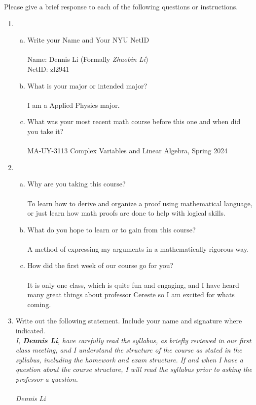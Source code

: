 \documentclass[12pt]{article}
\begin{document}
Please give a brief response to each of the following questions or instructions.
\begin{enumerate}
\item
    \begin{enumerate}[(a)]
        \item Write your Name and Your NYU NetID \\
        \\Name: Dennis Li (Formally \textit{Zhuobin Li})\\
        NetID: zl2941\\
        \item What is your major or intended major?\\
        \\I am a Applied Physics major.\\
        \item What was your most recent math course before this one and when did you take it?\\
        \\MA-UY-3113 Complex Variables and Linear Algebra, Spring 2024\\
    \end{enumerate}
\item
    \begin{enumerate}[(a)]
        \item Why are you taking this course? \\
        \\To learn how to derive and organize a proof using mathematical language, or just learn how math proofs are done to help with logical skills. \\
        \item What do you hope to learn or to gain from this course? \\
        \\A method of expressing my arguments in a mathematically rigorous way. \\
        \item How did the first week of our course go for you?\\
        \\It is only one class, which is quite fun and engaging, and I have heard many great things about professor Cereste so I am excited for whats coming.  \\
    \end{enumerate}

\item Write out the following statement. Include your name and signature where indicated.\\

\textit{I, \textbf{Dennis Li}, have carefully read the syllabus, as briefly reviewed in our first class meeting, and I understand the structure of the course as stated in the syllabus, including the homework and exam structure. If and when I have a question about the course structure, I will read the syllabus prior to asking the professor a question.}\\ \\
\textit{Dennis Li}

\end{enumerate}
\end{document}
